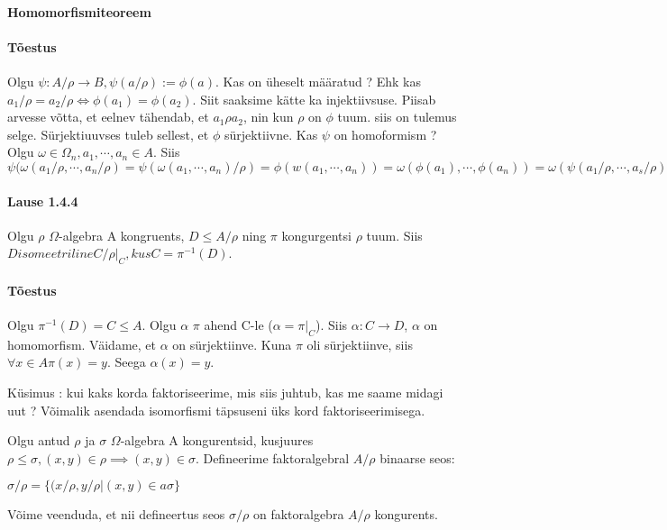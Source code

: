 \documentclass[12pt]{report}
\numberwithin{equation}{section}
\theoremstyle{definition}
\theoremstyle{plain}
\begin{document}
\paragraph{Homomorfismiteoreem}

\paragraph*{Tõestus}
Olgu $\psi : A/ \rho \rightarrow B, \psi(a / \rho) := \phi(a)$. Kas on \"uheselt määratud ? Ehk kas $a_1/ \rho = a_2 / \rho \iff \phi(a_1) = \phi (a_2)$. Siit saaksime kätte ka injektiivsuse. Piisab arvesse võtta, et eelnev tähendab, et $a_1 \rho a_2$, nin kun $\rho$ on $\phi$ tuum. siis on tulemus selge. Sürjektiuuvses tuleb sellest, et $\phi$ sürjektiivne. 
Kas $\psi$ on homoformism ?
Olgu $\omega \in \Omega_n, a_1, \cdots, a_n \in A$.
Siis  $\psi(\omega(a_1 / \rho, \cdots, a_n / \rho) = \psi (\omega(a_1, \cdots, a_n) / \rho) = \phi(w(a_1,\cdots,a_n)) = \omega(\phi(a_1),\cdots, \phi(a_n)) = \omega(\psi(a_1 / \rho, \cdots, a_s / \rho)).$

\paragraph{Lause 1.4.4} Olgu $\rho$ $\Omega $-algebra A kongruents, $D \leq A / \rho$ ning $\pi $ kongurgentsi $\rho $ tuum. Siis $D isomeetriline C / \rho|_C , kus C = \pi^{-1}(D) $.

\paragraph*{Tõestus}

Olgu $\pi^{-1}(D) = C \leq A$. Olgu $\alpha$ $\pi$ ahend C-le ($\alpha = \pi|_{C}$). Siis $\alpha : C \rightarrow D$, $\alpha$ on homomorfism. Väidame, et $\alpha$ on s\"urjektiinve. Kuna $\pi$ oli s\"urjektiinve, siis $\forall x \in A \pi(x) = y$. Seega $\alpha(x) = y$. 

K\"usimus : kui kaks korda faktoriseerime, mis siis juhtub, kas me saame midagi uut ? Võimalik asendada isomorfismi täpsuseni üks kord faktoriseerimisega. 

Olgu antud $\rho$ ja $\sigma$ $\Omega$-algebra A kongurentsid, kusjuures $\rho \leq \sigma, (x,y) \in \rho \implies (x,y) \in \sigma$. Defineerime faktoralgebral $A/ \rho$ binaarse seos:

$\sigma / \rho = \{(x / \rho, y / \rho  | (x,y) \in a \sigma \}$

Võime veenduda, et nii defineertus seos $\sigma / \rho$ on faktoralgebra $A / \rho$ kongurents.
\end{document}
